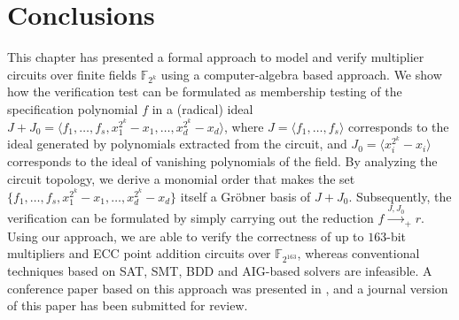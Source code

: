 \section{Conclusions}
This chapter has presented a formal approach to model and verify
multiplier circuits over finite fields $\mathbb{F}_{2^k}$ using a
computer-algebra based approach. We show how the verification test can 
be formulated as membership testing of the specification 
polynomial $f$ in a (radical) ideal $J + J_0 = \langle f_1, \dots, f_s,
x_1^{2^k} - x_1, \dots, x_d^{2^k} - x_d\rangle$, where $J = \langle f_1,
\dots, f_s\rangle$ corresponds to the ideal generated by polynomials
extracted from the circuit, and $J_0 = \langle x_i^{2^k} - x_i\rangle$
corresponds to the ideal of vanishing polynomials of the field.  
By analyzing the circuit topology, we derive a monomial order that
makes the set $\{f_1, \dots, f_s, x_1^{2^k} - x_1, \dots, x_d^{2^k} -
x_d\}$ itself a Gr\"obner basis of $J + J_0$. Subsequently, the
verification can be formulated by simply carrying out the reduction
$f\stackrel{J, J_0}{\rightarrow}_+ r$. Using our approach, we are able
to verify the correctness of up to $163$-bit multipliers and ECC point
addition circuits over $\mathbb{F}_{2^{163}}$, whereas conventional
techniques based on SAT, SMT, BDD and AIG-based solvers are
infeasible. A conference paper based on this approach was presented in
\cite{lv:date2012}, and a journal version of this paper
has been submitted for review.


